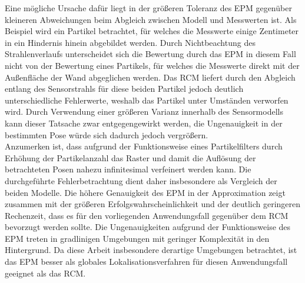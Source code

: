 Eine mögliche Ursache dafür liegt in der größeren Toleranz des EPM gegenüber kleineren Abweichungen beim Abgleich zwischen Modell und Messwerten ist. Als Beispiel wird ein Partikel betrachtet, für welches die Messwerte einige Zentimeter in ein Hindernis hinein abgebildet werden. Durch Nichtbeachtung des Strahlenverlaufs unterscheidet sich die Bewertung durch das EPM in diesem Fall nicht von der Bewertung eines Partikels, für welches die Messwerte direkt mit der Außenfläche der Wand abgeglichen werden. Das RCM liefert durch den Abgleich entlang des Sensorstrahls für diese beiden Partikel jedoch deutlich unterschiedliche Fehlerwerte, weshalb das Partikel unter Umständen verworfen wird. Durch Verwendung einer größeren Varianz innerhalb des Sensormodells kann dieser Tatsache zwar entgegengewirkt werden, die Ungenauigkeit in der bestimmten Pose würde sich dadurch jedoch vergrößern.\\

Anzumerken ist, dass aufgrund der Funktionsweise eines Partikelfilters durch Erhöhung der Partikelanzahl das Raster und damit die Auflösung der betrachteten Posen nahezu infinitesimal verfeinert werden kann. Die durchgeführte Fehlerbetrachtung dient daher insbesondere als Vergleich der beiden Modelle. Die höhere Genauigkeit des EPM in der Approximation zeigt zusammen mit der größeren Erfolgswahrscheinlichkeit und der deutlich geringeren Rechenzeit, dass es für den vorliegenden Anwendungsfall gegenüber dem RCM bevorzugt werden sollte. Die Ungenauigkeiten aufgrund der Funktionsweise des EPM treten in gradlinigen Umgebungen mit geringer Komplexität in den Hintergrund. Da diese Arbeit insbesondere derartige Umgebungen betrachtet, ist das EPM besser als globales Lokalisationsverfahren für diesen Anwendungsfall geeignet als das RCM.

\prever{
}








